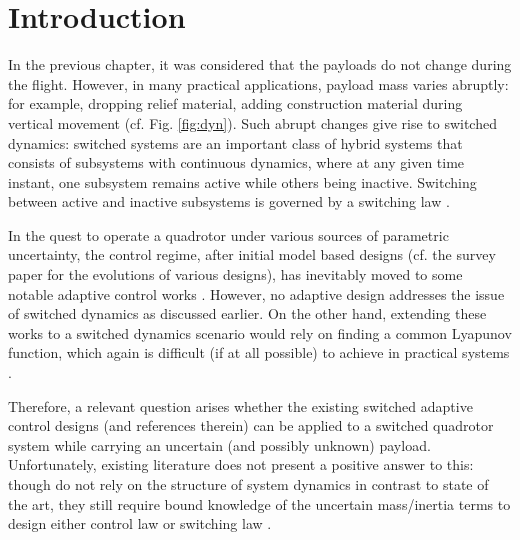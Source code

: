 \section{Introduction}

In the previous chapter, it was considered that the payloads do not change during the flight. However, in many practical applications, payload mass varies abruptly: for example, dropping relief material, adding construction material during vertical movement (cf. Fig. \ref{fig:dyn}). Such abrupt changes give rise to switched dynamics: switched systems are an important class of hybrid systems that consists of subsystems with continuous dynamics, where at any given time instant, one subsystem remains active while others being inactive. Switching between active and inactive subsystems is governed by a switching law \cite{liberzon2003switching}.

In the quest to operate a quadrotor under various sources of parametric uncertainty, the control regime, after initial model based designs (cf. the survey paper \cite{rubisurvey} for the evolutions of various designs), has inevitably moved to some notable adaptive control works \cite{nicol2011robust, bialy2013lyapunov, dydek2012adaptive, ha2014passivity, mofid2018adaptive, tran2018adaptive, tian2019adaptive, zhao2014nonlinear, yang2019energy, roy2021artificial}. However, no adaptive design addresses the issue of switched dynamics as discussed earlier. On the other hand, extending these works to a switched dynamics scenario would rely on finding a common Lyapunov function, which again is difficult (if at all possible) to achieve in practical systems \cite{lai2018adaptive}. 

Therefore, a relevant question arises whether the existing switched adaptive control designs \cite{lai2018adaptive,yuan2018robust,yuan2017adaptive,lou2018immersion, chen2018global,8362915, 7782779, roy2019reduced, roy2019simultaneous, roy2020vanishing} (and references therein) can be applied to a switched quadrotor system while carrying an uncertain (and possibly unknown) payload. Unfortunately, existing literature does not present a positive answer to this: though \cite{roy2019reduced, roy2019simultaneous} do not rely on the structure of system dynamics in contrast to state of the art, they still require bound knowledge of the uncertain mass/inertia terms to design either control law \cite{roy2019simultaneous} or switching law \cite{roy2019reduced}. 


